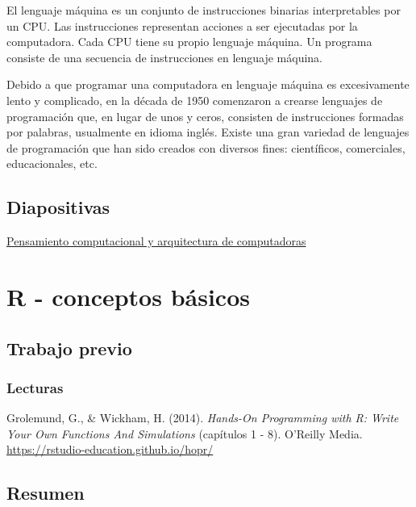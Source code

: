 \documentclass[
  letterpaper,
  DIV=11,
  numbers=noendperiod]{scrreprt}
\begin{document}
El lenguaje máquina es un conjunto de instrucciones binarias
interpretables por un CPU. Las instrucciones representan acciones a ser
ejecutadas por la computadora. Cada CPU tiene su propio lenguaje
máquina. Un programa consiste de una secuencia de instrucciones en
lenguaje máquina.

Debido a que programar una computadora en lenguaje máquina es
excesivamente lento y complicado, en la década de 1950 comenzaron a
crearse lenguajes de programación que, en lugar de unos y ceros,
consisten de instrucciones formadas por palabras, usualmente en idioma
inglés. Existe una gran variedad de lenguajes de programación que han
sido creados con diversos fines: científicos, comerciales,
educacionales, etc.

\hypertarget{diapositivas}{%
\section{Diapositivas}\label{diapositivas}}

\href{https://pf0953-programacionr.github.io/2022-ii-pensamiento_computacional-arquitectura_computadoras/}{Pensamiento
computacional y arquitectura de computadoras}

\hypertarget{r---conceptos-buxe1sicos}{%
\chapter{R - conceptos básicos}\label{r---conceptos-buxe1sicos}}

\hypertarget{trabajo-previo-4}{%
\section{Trabajo previo}\label{trabajo-previo-4}}

\hypertarget{lecturas-2}{%
\subsection{Lecturas}\label{lecturas-2}}

Grolemund, G., \& Wickham, H. (2014). \emph{Hands-On Programming with R:
Write Your Own Functions And Simulations} (capítulos 1 - 8). O'Reilly
Media. \url{https://rstudio-education.github.io/hopr/}

\hypertarget{resumen-3}{%
\section{Resumen}\label{resumen-3}}
\end{document}
